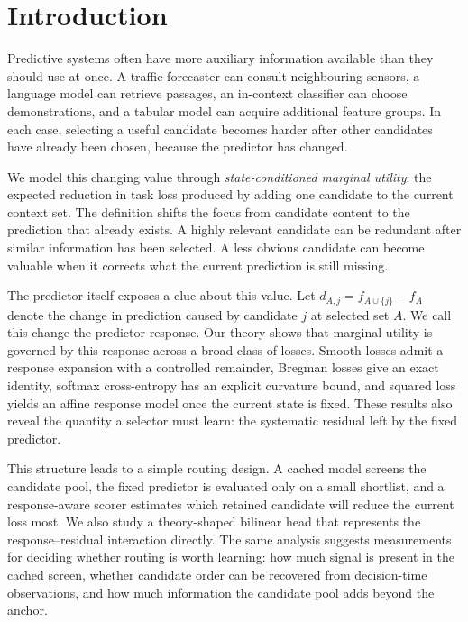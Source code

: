 \section{Introduction}

Predictive systems often have more auxiliary information available than they
should use at once. A traffic forecaster can consult neighbouring sensors, a
language model can retrieve passages, an in-context classifier can choose
demonstrations, and a tabular model can acquire additional feature groups. In
each case, selecting a useful candidate becomes harder after other candidates
have already been chosen, because the predictor has changed.

We model this changing value through \emph{state-conditioned marginal
utility}: the expected reduction in task loss produced by adding one candidate
to the current context set. The definition shifts the focus from candidate
content to the prediction that already exists. A highly relevant candidate can
be redundant after similar information has been selected. A less obvious
candidate can become valuable when it corrects what the current prediction is
still missing.

The predictor itself exposes a clue about this value. Let
$d_{A,j}=f_{A\cup\{j\}}-f_A$ denote the change in prediction caused by
candidate $j$ at selected set $A$. We call this change the predictor response.
Our theory shows that marginal utility is governed by this response across a
broad class of losses. Smooth losses admit a response expansion with a
controlled remainder, Bregman losses give an exact identity, softmax
cross-entropy has an explicit curvature bound, and squared loss yields an affine
response model once the current state is fixed. These results also reveal the
quantity a selector must learn: the systematic residual left by the fixed
predictor.

This structure leads to a simple routing design. A cached model screens the
candidate pool, the fixed predictor is evaluated only on a small shortlist, and
a response-aware scorer estimates which retained candidate will reduce the
current loss most. We also study a theory-shaped bilinear head that represents
the response--residual interaction directly. The same analysis suggests
measurements for deciding whether routing is worth learning: how much signal is
present in the cached screen, whether candidate order can be recovered from
decision-time observations, and how much information the candidate pool adds
beyond the anchor.

